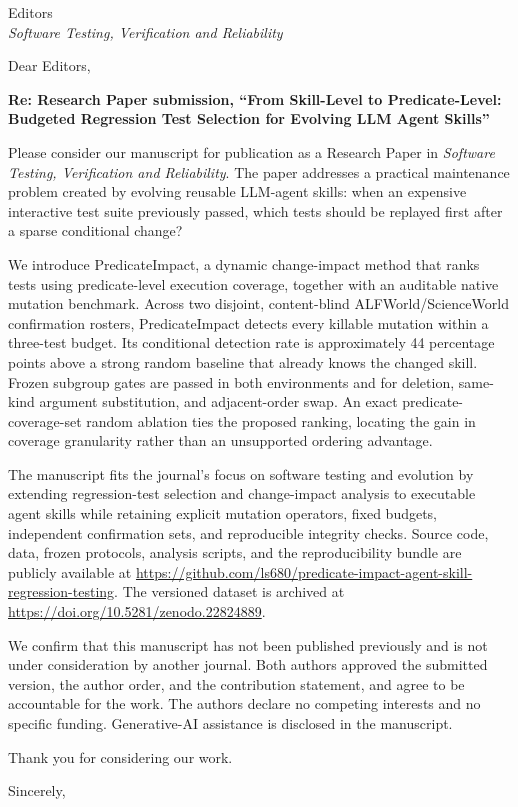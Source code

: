 \documentclass[11pt]{letter}
\date{18 September 2026}
\begin{document}
\begin{letter}{Editors\\\textit{Software Testing, Verification and Reliability}}
\opening{Dear Editors,}

\textbf{Re: Research Paper submission, ``From Skill-Level to Predicate-Level:
Budgeted Regression Test Selection for Evolving LLM Agent Skills''}

Please consider our manuscript for publication as a Research Paper in
\textit{Software Testing, Verification and Reliability}. The paper addresses a
practical maintenance problem created by evolving reusable LLM-agent skills:
when an expensive interactive test suite previously passed, which tests should
be replayed first after a sparse conditional change?

We introduce PredicateImpact, a dynamic change-impact method that ranks tests
using predicate-level execution coverage, together with an auditable native
mutation benchmark. Across two disjoint, content-blind ALFWorld/ScienceWorld
confirmation rosters, PredicateImpact detects every killable mutation within a
three-test budget. Its conditional detection rate is approximately 44
percentage points above a strong random baseline that already knows the changed
skill. Frozen subgroup gates are passed in both environments and for deletion,
same-kind argument substitution, and adjacent-order swap. An exact
predicate-coverage-set random ablation ties the proposed ranking, locating the
gain in coverage granularity rather than an unsupported ordering advantage.

The manuscript fits the journal's focus on software testing and evolution by
extending regression-test selection and change-impact analysis to executable
agent skills while retaining explicit mutation operators, fixed budgets,
independent confirmation sets, and reproducible integrity checks. Source code,
data, frozen protocols, analysis scripts, and the reproducibility bundle are
publicly available at
\url{https://github.com/ls680/predicate-impact-agent-skill-regression-testing}.
The versioned dataset is archived at
\url{https://doi.org/10.5281/zenodo.22824889}.

We confirm that this manuscript has not been published previously and is not
under consideration by another journal. Both authors approved the submitted
version, the author order, and the contribution statement, and agree to be
accountable for the work. The authors declare no competing interests and no
specific funding. Generative-AI assistance is disclosed in the manuscript.

Thank you for considering our work.

\closing{Sincerely,}
\end{letter}
\end{document}
